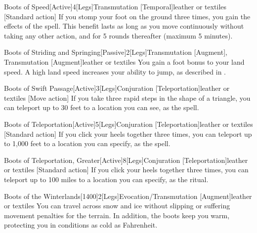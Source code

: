 \begin{magicitemdef}{Boots of Speed}[Active]{4}[Legs]{Transmutation [Temporal]}{leather or textiles}
    [Standard action] If you stomp your foot on the ground three times, you gain the effects of the  spell.
    This benefit lasts as long as you move continuously without taking any other action, and for 5 rounds thereafter (maximum 5 minutes).
\end{magicitemdef}

\begin{magicitemdef}{Boots of Striding and Springing}[Passive]{2}[Legs]{Transmutation [Augment], Transmutation [Augment]}{leather or textiles}
     You gain a  foot bonus to your land speed.
    A high land speed increases your ability to jump, as described in .
\end{magicitemdef}

\begin{magicitemdef}{Boots of Swift Passage}[Active]{3}[Legs]{Conjuration [Teleportation]}{leather or textiles}
    [Move action] If you take three rapid steps in the shape of a triangle, you can teleport up to 30 feet to a location you can see, as the  spell.
\end{magicitemdef}

\begin{magicitemdef}{Boots of Teleportation}[Active]{5}[Legs]{Conjuration [Teleportation]}{leather or textiles}
    [Standard action] If you click your heels together three times, you can teleport up to 1,000 feet to a location you can specify, as the  spell.
\end{magicitemdef}

\begin{magicitemdef}{Boots of Teleportation, Greater}[Active]{8}[Legs]{Conjuration [Teleportation]}{leather or textiles}
    [Standard action] If you click your heels together three times, you can teleport up to 100 miles to a location you can specify, as the  ritual.
\end{magicitemdef}

\begin{magicitemdef}{Boots of the Winterlands}[1400]{2}[Legs]{Evocation/Transmutation [Augment]}{leather or textiles}
     You can travel across snow and ice without slipping or suffering movement penalties for the terrain.
    In addition, the boots keep you warm, protecting you in conditions as cold as  Fahrenheit.
\end{magicitemdef}

